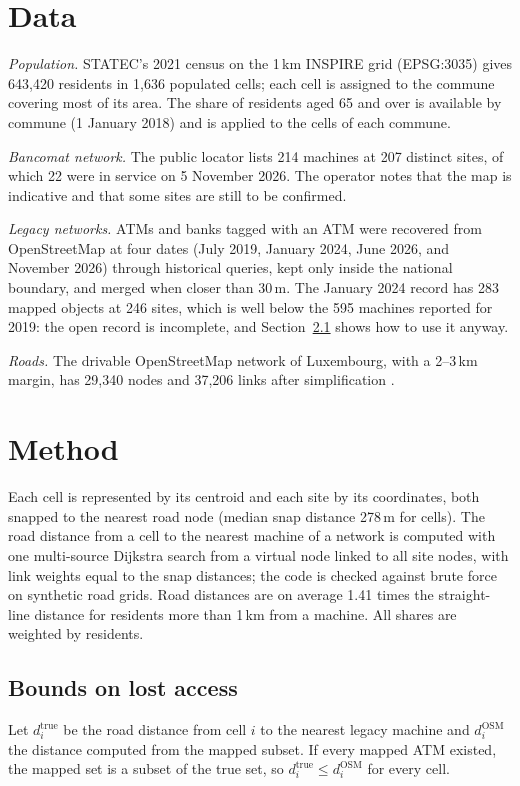 \documentclass[11pt]{article}
\begin{document}
\section{Data}
\emph{Population.} STATEC's 2021 census on the 1\,km INSPIRE grid (EPSG:3035) gives 643,420 residents in 1,636 populated cells; each cell is assigned to the commune covering most of its area. The share of residents aged 65 and over is available by commune (1 January 2018) and is applied to the cells of each commune.

\emph{Bancomat network.} The public locator lists 214 machines at 207 distinct sites, of which 22 were in service on 5 November 2026. The operator notes that the map is indicative and that some sites are still to be confirmed.

\emph{Legacy networks.} ATMs and banks tagged with an ATM were recovered from OpenStreetMap at four dates (July 2019, January 2024, June 2026, and November 2026) through historical queries, kept only inside the national boundary, and merged when closer than 30\,m. The January 2024 record has 283 mapped objects at 246 sites, which is well below the 595 machines reported for 2019: the open record is incomplete, and Section~\ref{sec:bounds} shows how to use it anyway.

\emph{Roads.} The drivable OpenStreetMap network of Luxembourg, with a 2--3\,km margin, has 29,340 nodes and 37,206 links after simplification \citep{boeing2017}.

\section{Method}
Each cell is represented by its centroid and each site by its coordinates, both snapped to the nearest road node (median snap distance 278\,m for cells). The road distance from a cell to the nearest machine of a network is computed with one multi-source Dijkstra search from a virtual node linked to all site nodes, with link weights equal to the snap distances; the code is checked against brute force on synthetic road grids. Road distances are on average 1.41 times the straight-line distance for residents more than 1\,km from a machine. All shares are weighted by residents.

\subsection{Bounds on lost access}\label{sec:bounds}
Let $d^{\mathrm{true}}_i$ be the road distance from cell $i$ to the nearest legacy machine and $d^{\mathrm{OSM}}_i$ the distance computed from the mapped subset. If every mapped ATM existed, the mapped set is a subset of the true set, so $d^{\mathrm{true}}_i \le d^{\mathrm{OSM}}_i$ for every cell.
\end{document}
